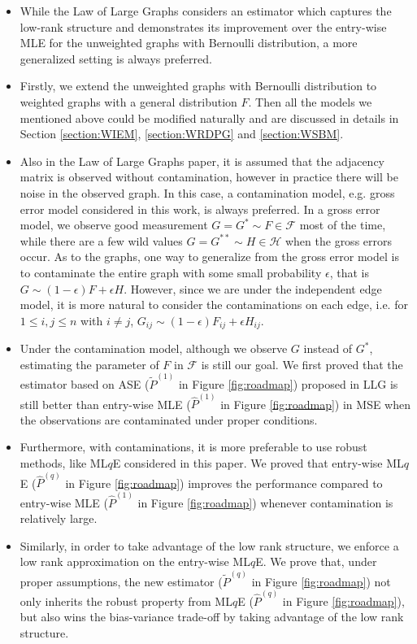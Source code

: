 \documentclass[a4paper]{article}
\begin{document}
\begin{itemize}
\item While the Law of Large Graphs considers an estimator which captures the low-rank structure and demonstrates its improvement over the entry-wise MLE for the unweighted graphs with Bernoulli distribution, a more generalized setting is always preferred.

\item Firstly, we extend the unweighted graphs with Bernoulli distribution to weighted graphs with a general distribution $F$. Then all the models we mentioned above could be modified naturally and are discussed in details in Section \ref{section:WIEM}, \ref{section:WRDPG} and \ref{section:WSBM}.

\item Also in the Law of Large Graphs paper, it is assumed that the adjacency matrix is observed without contamination, however in practice there will be noise in the observed graph. In this case, a contamination model, e.g. gross error model considered in this work, is always preferred. In a gross error model, we observe good measurement $G = G^* \sim F \in \mathcal{F}$ most of the time, while there are a few wild values $G = G^{**} \sim H \in \mathcal{H}$ when the gross errors occur.
As to the graphs, one way to generalize from the gross error model is to contaminate the entire graph with some small probability $\epsilon$, that is $G \sim (1-\epsilon) F + \epsilon H$. However, since we are under the independent edge model, it is more natural to consider the contaminations on each edge, i.e. for $1 \le i, j \le n$ with $i \ne j$, $G_{ij} \sim (1-\epsilon) F_{ij} + \epsilon H_{ij}$.

\item Under the contamination model, although we observe $G$ instead of $G^*$, estimating the parameter of $F$ in $\mathcal{F}$ is still our goal. We first proved that the estimator based on ASE ($\widetilde{P}^{(1)}$ in Figure \ref{fig:roadmap}) proposed in LLG is still better than entry-wise MLE ($\hat{P}^{(1)}$ in Figure \ref{fig:roadmap}) in MSE when the observations are contaminated under proper conditions.

\item Furthermore, with contaminations, it is more preferable to use robust methods, like ML$q$E \cite{ferrari2010, qin2013maximum} considered in this paper. We proved that entry-wise ML$q$E ($\hat{P}^{(q)}$ in Figure \ref{fig:roadmap}) improves the performance compared to entry-wise MLE ($\hat{P}^{(1)}$ in Figure \ref{fig:roadmap}) whenever contamination is relatively large.

\item Similarly, in order to take advantage of the low rank structure, we enforce a low rank approximation on the entry-wise ML$q$E. We prove that, under proper assumptions, the new estimator ($\widetilde{P}^{(q)}$ in Figure \ref{fig:roadmap}) not only inherits the robust property from ML$q$E ($\hat{P}^{(q)}$ in Figure \ref{fig:roadmap}), but also wins the bias-variance trade-off by taking advantage of the low rank structure.

\end{itemize}
\end{document}
